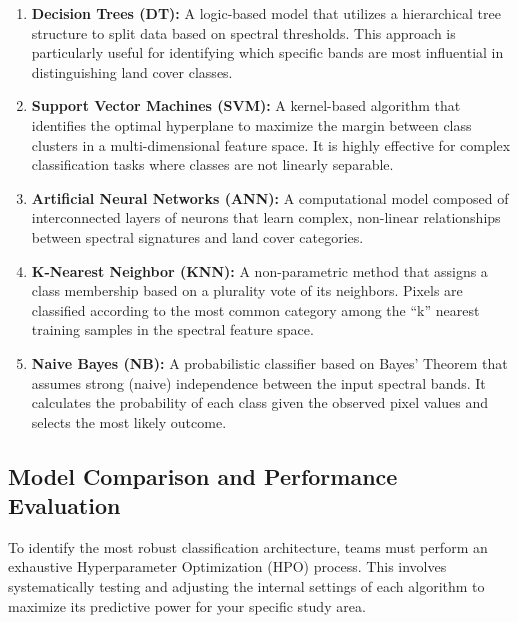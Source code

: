 \documentclass{article}
\begin{document}
\begin{enumerate}
    \item \textbf{Decision Trees (DT):} A logic-based model that utilizes a hierarchical tree structure to split data based on spectral thresholds. This approach is particularly useful for identifying which specific bands are most influential in distinguishing land cover classes.

    \item \textbf{Support Vector Machines (SVM):} A kernel-based algorithm that identifies the optimal hyperplane to maximize the margin between class clusters in a multi-dimensional feature space. It is highly effective for complex classification tasks where classes are not linearly separable.

    \item \textbf{Artificial Neural Networks (ANN):} A computational model composed of interconnected layers of neurons that learn complex, non-linear relationships between spectral signatures and land cover categories.

    \item \textbf{K-Nearest Neighbor (KNN):} A non-parametric method that assigns a class membership based on a plurality vote of its neighbors. Pixels are classified according to the most common category among the ``k'' nearest training samples in the spectral feature space.

    \item \textbf{Naive Bayes (NB):} A probabilistic classifier based on Bayes' Theorem that assumes strong (naive) independence between the input spectral bands. It calculates the probability of each class given the observed pixel values and selects the most likely outcome.
\end{enumerate}

\subsection{Model Comparison and Performance Evaluation}
To identify the most robust classification architecture, teams must perform an exhaustive Hyperparameter Optimization (HPO) process. This involves systematically testing and adjusting the internal settings of each algorithm to maximize its predictive power for your specific study area.
\end{document}
